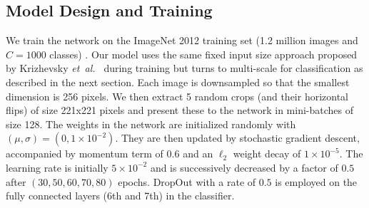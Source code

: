 \documentclass{article} %
\def\etal{{\textit{et~al.~}}}
\begin{document}
\subsection{Model Design and Training}
\label{sec:model_training}
We train the network on the ImageNet 2012 training set (1.2 million
images and $C=1000$ classes) \cite{imagenet}. Our model uses the same fixed input size
approach proposed by Krizhevsky \etal \cite{Kriz12} during training but turns to
multi-scale for classification as described in the next section. Each image is
downsampled so that the smallest dimension is 256 pixels. We then
extract 5 random crops (and their horizontal flips) of size 221x221
pixels and present these to the network in mini-batches of size
128. The weights in the network are initialized randomly with
$(\mu,\sigma)=(0,1 \times 10^{-2})$. They are then updated by stochastic gradient
descent, accompanied by momentum term of $0.6$ and an $\ell_2$ weight decay of
$1 \times 10^{-5}$. The learning rate is initially $5 \times 10^{-2}$ and is
successively decreased by a factor of $0.5$ after $(30,50,60,70,80)$ epochs.
DropOut \cite{Hinton12} with a rate of $0.5$ is employed on the fully connected layers (6th
and 7th) in the classifier.
\end{document}
